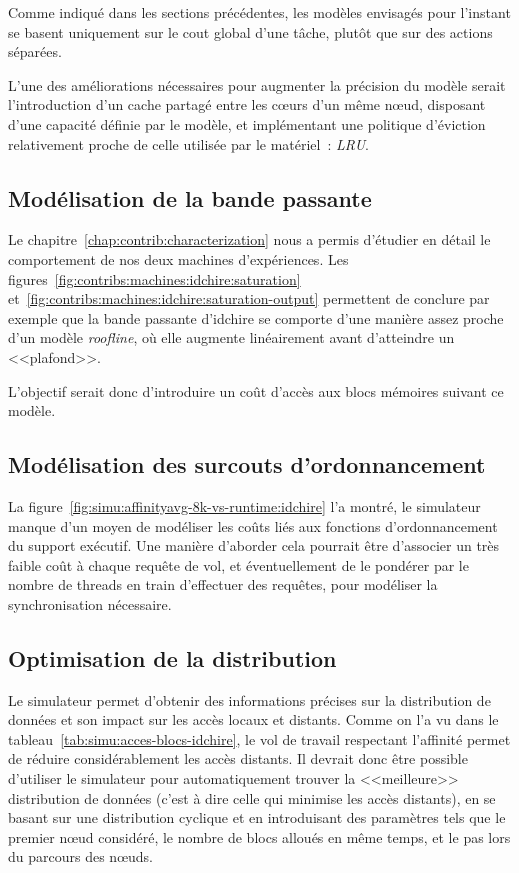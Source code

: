 Comme indiqué dans les sections précédentes, les modèles envisagés pour l'instant se basent uniquement sur le cout global d'une tâche, plutôt que sur des actions séparées.

L'une des améliorations nécessaires pour augmenter la précision du modèle serait l'introduction d'un cache partagé entre les cœurs d'un même nœud, disposant d'une capacité définie par le modèle, et implémentant une politique d'éviction relativement proche de celle utilisée par le matériel~: \emph{LRU}.

\subsection{Modélisation de la bande passante}

Le chapitre~\ref{chap:contrib:characterization} nous a permis d'étudier en détail le comportement de nos deux machines d'expériences.
Les figures~\ref{fig:contribs:machines:idchire:saturation} et~\ref{fig:contribs:machines:idchire:saturation-output} permettent de conclure par exemple que la bande passante d'idchire se comporte d'une manière assez proche d'un modèle \emph{roofline}, où elle augmente linéairement avant d'atteindre un <<plafond>>.

L'objectif serait donc d'introduire un coût d'accès aux blocs mémoires suivant ce modèle.

\subsection{Modélisation des surcouts d'ordonnancement}

La figure~\ref{fig:simu:affinityavg-8k-vs-runtime:idchire} l'a montré, le simulateur manque d'un moyen de modéliser les coûts liés aux fonctions d'ordonnancement du support exécutif.
Une manière d'aborder cela pourrait être d'associer un très faible coût à chaque requête de vol, et éventuellement de le pondérer par le nombre de threads en train d'effectuer des requêtes, pour modéliser la synchronisation nécessaire.

\subsection{Optimisation de la distribution}

Le simulateur permet d'obtenir des informations précises sur la distribution de données et son impact sur les accès locaux et distants.
Comme on l'a vu dans le tableau~\ref{tab:simu:acces-blocs-idchire}, le vol de travail respectant l'affinité permet de réduire considérablement les accès distants.
Il devrait donc être possible d'utiliser le simulateur pour automatiquement trouver la <<meilleure>> distribution de données (c'est à dire celle qui minimise les accès distants), en se basant sur une distribution cyclique et en introduisant des paramètres tels que le premier nœud considéré, le nombre de blocs alloués en même temps, et le pas lors du parcours des nœuds.
